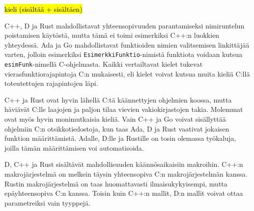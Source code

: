 \hl{kieli (sisältää + sisältäen)}

C++, D ja Rust mahdollistavat yhteensopivuuden parantamiseksi nimiruntelun
poistamisen käytöstä, mutta tämä ei toimi esimerkiksi C++:n luokkien
yhteydessä. Ada ja Go mahdollistavat funktioiden nimien valitsemisen
linkittäjää varten, jolloin esimerkiksi \texttt{EsimerkkiFunktio}-nimistä
funktiota voidaan kutsua \texttt{esimFunk}-nimellä C-ohjelmasta. Kaikki
vertailtavat kielet tukevat vierasfunktiorajapintoja C:n mukaisesti, eli kielet
voivat kutsua muita kieliä C:llä toteutettujen rajapintojen läpi.

C++ ja Rust ovat hyvin lähellä C:tä käännettyjen ohjelmien koossa, mutta
häviävät C:lle laajojen ja paljon tilaa vievien vakiokirjastojen takia.
Molemmat ovat myös hyvin monimutkaisia kieliä. Vain C++ ja Go voivat
sisällyttää ohjelmiin C:n otsikkotiedostoja, kun taas Ada, D ja Rust vaativat
jokaisen funktion määrittämistä. Adalle, D:lle ja Rustille on tosin olemassa
työkaluja, joilla tämän määrittämisen voi automatisoida.

D, C++ ja Rust sisältävät mahdollisuuden käännösaikaisiin makroihin. C++:n
makrojärjestelmä on melkein täysin yhteensopiva C:n makrojärjestelmän kanssa.
Rustin makrojärjestelmä on taas huomattavasti ilmaisukykyisempi, mutta
epäyhteensopiva C:n kanssa. Toisin kuin C++:n mallit, D:n mallit voivat ottaa
parametreiksi vain tyyppejä.

\newpage


